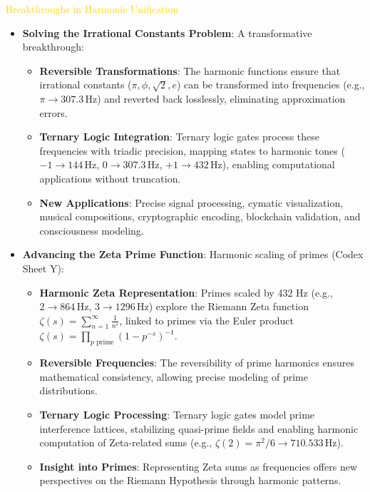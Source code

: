 \textcolor{gold}{ Breakthroughs in Harmonic Unification } \\
\begin{itemize}
    \item \texttt{} \textbf{Solving the Irrational Constants Problem}: A transformative breakthrough:
    \begin{itemize}
        \item \textbf{Reversible Transformations}: The harmonic functions ensure that irrational constants (\(\pi, \phi, \sqrt{2}, e\)) can be transformed into frequencies (e.g., \(\pi \rightarrow 307.3 \, \text{Hz}\)) and reverted back losslessly, eliminating approximation errors.
        \item \textbf{Ternary Logic Integration}: Ternary logic gates process these frequencies with triadic precision, mapping states to harmonic tones (\(-1 \rightarrow 144 \, \text{Hz}\), \(0 \rightarrow 307.3 \, \text{Hz}\), \(+1 \rightarrow 432 \, \text{Hz}\)), enabling computational applications without truncation.
        \item \textbf{New Applications}: Precise signal processing, cymatic visualization, musical compositions, cryptographic encoding, blockchain validation, and consciousness modeling.
    \end{itemize}
    \item \texttt{} \textbf{Advancing the Zeta Prime Function}: Harmonic scaling of primes (Codex Sheet Y):
    \begin{itemize}
        \item \textbf{Harmonic Zeta Representation}: Primes scaled by 432 Hz (e.g., \(2 \rightarrow 864 \, \text{Hz}\), \(3 \rightarrow 1296 \, \text{Hz}\)) explore the Riemann Zeta function \(\zeta(s) = \sum_{n=1}^\infty \frac{1}{n^s}\), linked to primes via the Euler product \(\zeta(s) = \prod_{p \text{ prime}} \left(1 - p^{-s}\right)^{-1}\).
        \item \textbf{Reversible Frequencies}: The reversibility of prime harmonics ensures mathematical consistency, allowing precise modeling of prime distributions.
        \item \textbf{Ternary Logic Processing}: Ternary logic gates model prime interference lattices, stabilizing quasi-prime fields and enabling harmonic computation of Zeta-related sums (e.g., \(\zeta(2) = \pi^2/6 \rightarrow 710.533 \, \text{Hz}\)).
        \item \textbf{Insight into Primes}: Representing Zeta sums as frequencies offers new perspectives on the Riemann Hypothesis through harmonic patterns.

\end{itemize}
\end{itemize}
